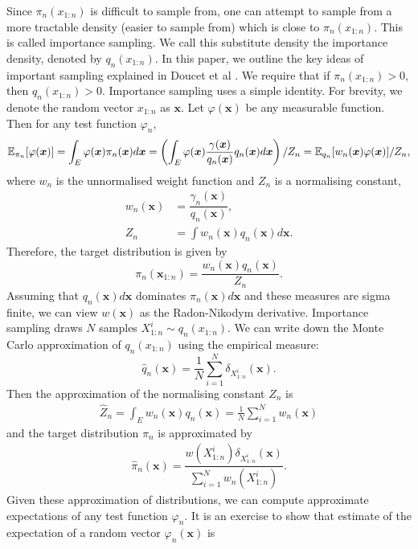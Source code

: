 \documentclass[10pt]{article}
\theoremstyle{definition}
\numberwithin{equation}{section}
\begin{document}
Since $\pi_n(x_{1:n})$ is difficult to sample from, one can attempt to sample from a more tractable density (easier to sample from) which is close to $\pi_n(x_{1:n})$. This is called importance sampling. We call this substitute density the importance density, denoted by $q_n(x_{1:n})$. In this paper, we outline the key ideas of important sampling explained in Doucet et al \cite{doucet2008}. We require that if $\pi_n(x_{1:n}) > 0$, then $q_n(x_{1:n}) > 0$. Importance sampling uses a simple identity. For brevity, we denote the random vector $x_{1:n}$ as $\bm{x}$. Let $\varphi(\bm{x})$ be any measurable function. Then for any test function $\varphi_n$, 
\begin{equation}
	\mathbb{E}_{\pi_n}[\varphi(\bm{x})]= \int_E \varphi(\bm{\bm{x}})\pi_n(\bm{\bm{x}})d\bm{x} = \left(\int_E \varphi(\bm{x}) \frac{\gamma(\bm{x})}{q_n(\bm{x})} q_n(\bm{x}) d\bm{x}\right)/Z_n = \mathbb{E}_{q_n}[w_n(\bm{x})\varphi(\bm{x})]/ Z_n,
\end{equation}
where $w_n$ is the unnormalised weight function and $Z_n$ is a normalising constant,
\begin{align}
	w_n(\bm{x}) &= \dfrac{\gamma_n(\bm{x})}{q_n(\bm{x})},\\
	Z_n &= \int w_n(\bm{x})q_n(\bm{x}) d\bm{x}.
\end{align}
Therefore, the target distribution is given by
\begin{equation}
	\pi_n(\bm{x}_{1:n}) = \dfrac{w_n(\bm{x})q_n(\bm{x})}{Z_n}.
\end{equation}
Assuming that $q_n(\bm{x})d\bm{x}$ dominates $\pi_n(\bm{x})d\bm{x}$ and these measures are sigma finite, we can view $w(\bm{x})$ as the Radon-Nikodym derivative. Importance sampling draws $N$ samples $X^i_{1:n} \sim q_n(x_{1:n})$. We can write down the Monte Carlo approximation of $q_n(x_{1:n})$ using the empirical measure:
\begin{equation}
	\hat{q}_n(\bm{x}) = \dfrac{1}{N}\sum_{i=1}^{N}\delta_{X^i_{1:n}}(\bm{x}).
\end{equation}
Then the approximation of the normalising constant $Z_n$ is
\begin{align}
	\hat{Z}_n = \int_E w_n(\bm{x}) q_n(\bm{x}) = \frac{1}{N}\sum_{i=1}^{N} w_n(\bm{x})
\end{align} and the target distribution $\pi_n$ is approximated by
\begin{align} \label{eq:emp_dist}
	\hat{\pi}_n(\bm{x}) = \dfrac{w(X^i_{1:n})\delta_{X^i_{1:n}}(\bm{x})}{\sum_{i=1}^{N} w_n(X^i_{1:n})}.
\end{align}
Given these approximation of distributions, we can compute approximate expectations of any test function $\varphi_n$. It is an exercise to show that estimate of the expectation of a random vector $\varphi_n(\bm{x})$ is
\end{document}
